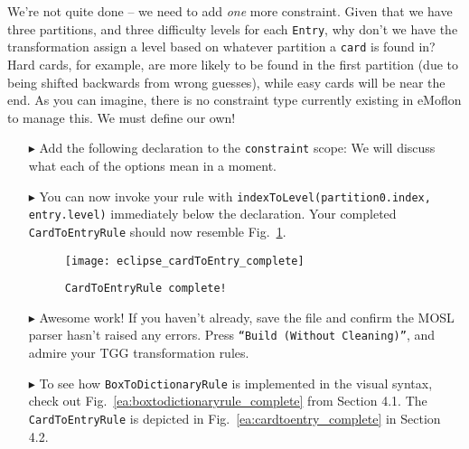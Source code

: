 \newpage

We're not quite done -- we need to add \emph{one} more constraint. Given that we have three partitions, and three difficulty levels for each \texttt{Entry}, why
don't we have the transformation assign a level based on whatever partition a \texttt{card} is found in? Hard cards, for example, are more likely to be found in the first
partition (due to being shifted backwards from wrong guesses), while easy cards will be near the end.  As you can imagine, there is no constraint type currently
existing in eMoflon to manage this. We must define our own!

\begin{itemize}

\item[$\blacktriangleright$] Add the following declaration to the \texttt{constraint} scope:  We will discuss what
each of the options mean in a moment.

\vspace{0.5cm}

\item[$\blacktriangleright$] You can now invoke your rule with \texttt{indexToLevel(partition0.index, entry.level)} immediately below the declaration. Your
completed \texttt{CardToEntryRule} should now resemble Fig.~\ref{eclipse:c2eDone}.

\begin{figure}[htbp]
\begin{center}
  \texttt{[image: eclipse\_cardToEntry\_complete]}
  \caption{\texttt{CardToEntryRule complete!}}
  \label{eclipse:c2eDone}
\end{center}
\end{figure}

\vspace{0.5cm}

\item[$\blacktriangleright$] Awesome work! If you haven't already, save the file and confirm the MOSL parser hasn't raised any errors. Press \texttt{``Build
(Without Cleaning)''}, and admire your TGG transformation rules. 

\vspace{0.5cm}

\item[$\blacktriangleright$] To see how \texttt{BoxToDictionaryRule} is implemented in the visual syntax, check out Fig.~\ref{ea:boxtodictionaryrule_complete}
from Section 4.1. The \texttt{CardToEntryRule} is depicted in Fig.~\ref{ea:cardtoentry_complete} in Section 4.2.

\end{itemize}

